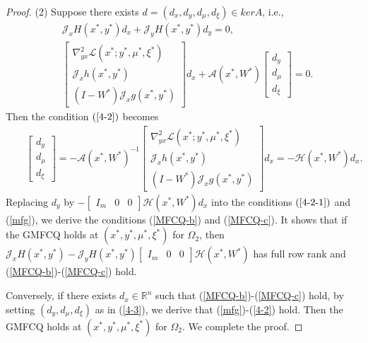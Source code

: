 \documentclass[11pt]{article}
\theoremstyle{definition}
\theoremstyle{remark}
\numberwithin{equation}{section}
\begin{document}
\begin{proof}
(2) Suppose there exists $d= (d_x,d_y,d_{\mu},d_{\xi})\in ker A$, i.e.,
  \begin{eqnarray}
        &\mathcal{J}_xH(x^*,y^*)d_x+\mathcal{J}_yH(x^*,y^*)d_y=0,\label{4-2-1}\\
    & \left[ \begin{array}{c}
           \nabla_{yx}^2 \mathcal{L}(x^*;y^*,\mu^*,\xi^*)
                     \\
          \mathcal{J}_x h(x^*,y^*)  \\
       (I-W^*)\mathcal{J}_x g(x^*,y^*)
         \end{array} \right]d_x +\mathcal{A}(x^*,W^*)\left[\begin{array}{c}
       d_y\\
       d_{\mu}\\
       d_{\xi}
              \end{array}
         \right]=0.\label{4-2}
 \end{eqnarray}
Then the condition $ (\ref{4-2})$ becomes
 \begin{eqnarray}
&&\left[\begin{array}{c}
       d_y\\
       d_{\mu}\\
       d_{\xi}
              \end{array}
         \right]=-\mathcal{A}(x^*,W^*)^{-1}\left[ \begin{array}{c}
           \nabla_{yx}^2 \mathcal{L}(x^*;y^*,\mu^*,\xi^*)
                     \\
          \mathcal{J}_x h(x^*,y^*)  \\
       (I-W^*)\mathcal{J}_x g(x^*,y^*)
         \end{array} \right]d_x=-\mathcal{H}(x^*,W^*)d_x.\label{4-3}
 \end{eqnarray}
Replacing $d_y$ by $ -[\begin{array}{ccc}
                        I_m & 0 & 0
                      \end{array}]\mathcal{H}(x^*,W^*)d_x$ into the conditions $(\ref{4-2-1})$ and (\ref{mfg}), we
                      derive the conditions (\ref{MFCQ-b}) and (\ref{MFCQ-c}).
 It shows that if the GMFCQ holds at $(x^*,y^*,\mu^*,\xi^*)$ for $\Omega_2$, then
 $\mathcal{J}_xH(x^*,y^*)-\mathcal{J}_yH(x^*,y^*)[\begin{array}{ccc}
          I_m &0 & 0
            \end{array}] \mathcal{H}(x^*,W^*)$ has full row rank and (\ref{MFCQ-b})-(\ref{MFCQ-c}) hold.

 Conversely, if there exists $d_x\in \mathbb{R}^n$ such that (\ref{MFCQ-b})-(\ref{MFCQ-c}) hold, by setting $(d_y,
 d_{\mu}, d_{\xi})$ as in (\ref{4-3}), we derive that (\ref{mfg})-(\ref{4-2}) hold. Then the GMFCQ holds at
 $(x^*,y^*,\mu^*,\xi^*)$ for $\Omega_2$.
We complete the proof.
\end{proof}
\end{document}
